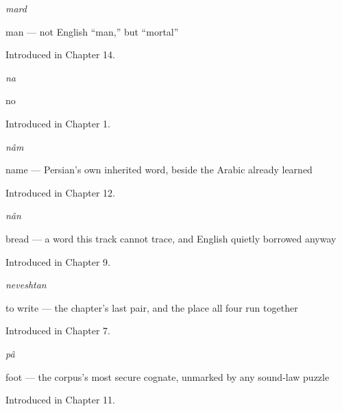 \noindent\begin{minipage}[t]{\linewidth}
\raggedright
\textbf{}\enspace\emph{mard}\par
\small man — not English \textquotedblleft{}man,\textquotedblright{} but \textquotedblleft{}mortal\textquotedblright{}\par
\footnotesize Introduced in Chapter 14.
\end{minipage}\par\medskip

\noindent\begin{minipage}[t]{\linewidth}
\raggedright
\textbf{}\enspace\emph{na}\par
\small no\par
\footnotesize Introduced in Chapter 1.
\end{minipage}\par\medskip

\noindent\begin{minipage}[t]{\linewidth}
\raggedright
\textbf{}\enspace\emph{nâm}\par
\small name — Persian's own inherited word, beside the Arabic  already learned\par
\footnotesize Introduced in Chapter 12.
\end{minipage}\par\medskip

\noindent\begin{minipage}[t]{\linewidth}
\raggedright
\textbf{}\enspace\emph{nân}\par
\small bread — a word this track cannot trace, and English quietly borrowed anyway\par
\footnotesize Introduced in Chapter 9.
\end{minipage}\par\medskip

\noindent\begin{minipage}[t]{\linewidth}
\raggedright
\textbf{}\enspace\emph{neveshtan}\par
\small to write — the chapter's last pair, and the place all four run together\par
\footnotesize Introduced in Chapter 7.
\end{minipage}\par\medskip

\noindent\begin{minipage}[t]{\linewidth}
\raggedright
\textbf{}\enspace\emph{pâ}\par
\small foot — the corpus's most secure cognate, unmarked by any sound-law puzzle\par
\footnotesize Introduced in Chapter 11.
\end{minipage}\par\medskip

